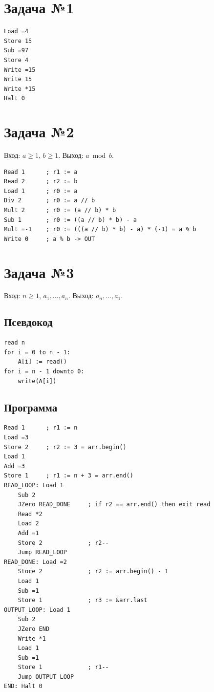 \documentclass[12pt]{article}
\begin{document}
\section*{Задача №1}

\begin{verbatim}
Load =4
Store 15
Sub =97
Store 4
Write =15
Write 15
Write *15
Halt 0
\end{verbatim}

\section*{Задача №2}

Вход: $a\geq 1$, $b\geq 1$. Выход: $a\bmod b$.

\begin{verbatim}
Read 1		; r1 := a
Read 2		; r2 := b
Load 1		; r0 := a
Div 2		; r0 := a // b
Mult 2		; r0 := (a // b) * b
Sub 1		; r0 := ((a // b) * b) - a
Mult =-1	; r0 := (((a // b) * b) - a) * (-1) = a % b
Write 0		; a % b -> OUT
\end{verbatim}

\section*{Задача №3}

Вход: $n\geq 1$, $a_1,\ldots,a_n$. Выход: $a_n,\ldots,a_1$.

\subsection*{Псевдокод}

\begin{verbatim}
read n
for i = 0 to n - 1:
    A[i] := read()
for i = n - 1 downto 0:
    write(A[i])
\end{verbatim}

\subsection*{Программа}

\begin{verbatim}
Read 1		; r1 := n
Load =3
Store 2		; r2 := 3 = arr.begin()
Load 1
Add =3
Store 1		; r1 := n + 3 = arr.end()
READ_LOOP: Load 1
	Sub 2
	JZero READ_DONE		; if r2 == arr.end() then exit read
	Read *2
	Load 2
	Add =1
	Store 2				; r2--
	Jump READ_LOOP
READ_DONE: Load =2
	Store 2				; r2 := arr.begin() - 1
    Load 1
    Sub =1
    Store 1             ; r3 := &arr.last
OUTPUT_LOOP: Load 1
	Sub 2
	JZero END
	Write *1
	Load 1
	Sub =1
	Store 1				; r1--
	Jump OUTPUT_LOOP
END: Halt 0
\end{verbatim}
\end{document}
